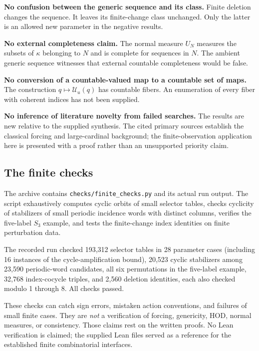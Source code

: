 \documentclass[11pt,letterpaper]{article}
\theoremstyle{definition}
\numberwithin{equation}{section}
\newcommand{\UU}{\mathscr U}
\begin{document}
\textbf{No confusion between the generic sequence and its class.}
Finite deletion changes the sequence. It leaves its finite-change class unchanged. Only the latter is an allowed new parameter in the negative results.

\textbf{No external completeness claim.}
The normal measure $U_N$ measures the subsets of $\kappa$ belonging to $N$ and is complete for sequences in $N$. The ambient generic sequence witnesses that external countable completeness would be false.

\textbf{No conversion of a countable-valued map to a countable set of maps.}
The construction $q\mapsto\UU_u(q)$ has countable fibers. An enumeration of every fiber with coherent indices has not been supplied.

\textbf{No inference of literature novelty from failed searches.}
The results are new relative to the supplied synthesis. The cited primary sources establish the classical forcing and large-cardinal background; the finite-observation application here is presented with a proof rather than an unsupported priority claim.

\subsection{The finite checks}

The archive contains \nolinkurl{checks/finite_checks.py} and its actual run output. The script exhaustively computes cyclic orbits of small selector tables, checks cyclicity of stabilizers of small periodic incidence words with distinct columns, verifies the five-label $S_3$ example, and tests the finite-change index identities on finite perturbation data.

The recorded run checked 193,312 selector tables in 28 parameter cases (including 16 instances of the cycle-amplification bound), 20,523 cyclic stabilizers among 23,590 periodic-word candidates, all six permutations in the five-label example, 32,768 index-cocycle triples, and 2,560 deletion identities, each also checked modulo 1 through 8. All checks passed.

These checks can catch sign errors, mistaken action conventions, and failures of small finite cases. They are \emph{not} a verification of forcing, genericity, HOD, normal measures, or consistency. Those claims rest on the written proofs. No Lean verification is claimed; the supplied Lean files served as a reference for the established finite combinatorial interfaces.
\end{document}
